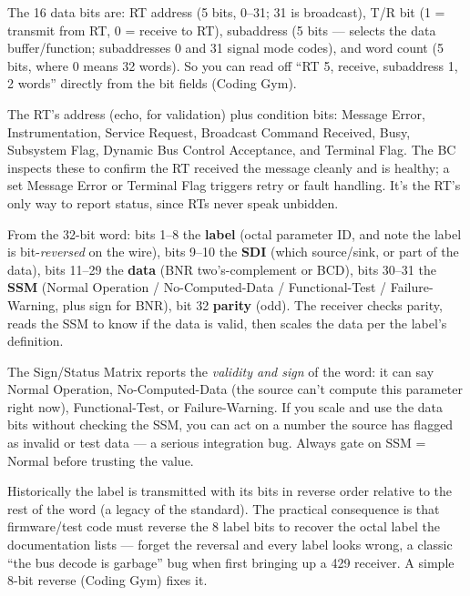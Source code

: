 The 16 data bits are: RT address (5 bits, 0--31; 31 is broadcast), T/R bit
(1 = transmit from RT, 0 = receive to RT), subaddress (5 bits --- selects the
data buffer/function; subaddresses 0 and 31 signal mode codes), and word count
(5 bits, where 0 means 32 words). So you can read off ``RT 5, receive, subaddress
1, 2 words'' directly from the bit fields (Coding Gym).

The RT's address (echo, for validation) plus condition bits: Message Error,
Instrumentation, Service Request, Broadcast Command Received, Busy, Subsystem
Flag, Dynamic Bus Control Acceptance, and Terminal Flag. The BC inspects these
to confirm the RT received the message cleanly and is healthy; a set Message
Error or Terminal Flag triggers retry or fault handling. It's the RT's only way
to report status, since RTs never speak unbidden.

From the 32-bit word: bits 1--8 the \textbf{label} (octal parameter ID, and note
the label is bit-\emph{reversed} on the wire), bits 9--10 the \textbf{SDI}
(which source/sink, or part of the data), bits 11--29 the \textbf{data} (BNR
two's-complement or BCD), bits 30--31 the \textbf{SSM} (Normal Operation /
No-Computed-Data / Functional-Test / Failure-Warning, plus sign for BNR), bit 32
\textbf{parity} (odd). The receiver checks parity, reads the SSM to know if the
data is valid, then scales the data per the label's definition.

The Sign/Status Matrix reports the \emph{validity and sign} of the word: it can
say Normal Operation, No-Computed-Data (the source can't compute this parameter
right now), Functional-Test, or Failure-Warning. If you scale and use the data
bits without checking the SSM, you can act on a number the source has flagged as
invalid or test data --- a serious integration bug. Always gate on SSM = Normal
before trusting the value.

Historically the label is transmitted with its bits in reverse order relative to
the rest of the word (a legacy of the standard). The practical consequence is
that firmware/test code must reverse the 8 label bits to recover the octal label
the documentation lists --- forget the reversal and every label looks wrong, a
classic ``the bus decode is garbage'' bug when first bringing up a 429 receiver.
A simple 8-bit reverse (Coding Gym) fixes it.

